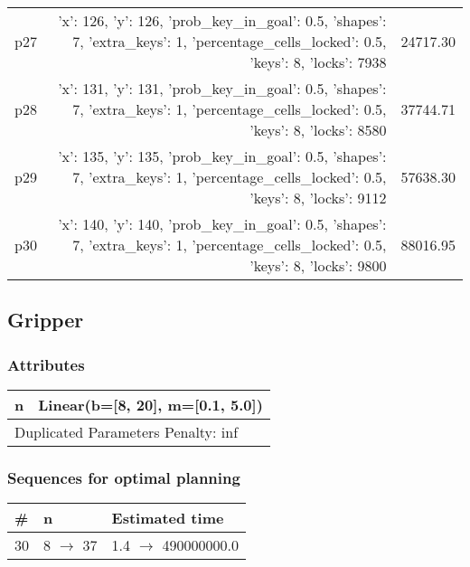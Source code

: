 \documentclass{article}
\begin{document}
\begin{center}
\begin{tabular}{@{}l|r|r@{}}
  p27&{'x': 126, 'y': 126, 'prob\_key\_in\_goal': 0.5, 'shapes': 7, 'extra\_keys': 1, 'percentage\_cells\_locked': 0.5, 'keys': 8, 'locks': 7938}&24717.30\\
  p28&{'x': 131, 'y': 131, 'prob\_key\_in\_goal': 0.5, 'shapes': 7, 'extra\_keys': 1, 'percentage\_cells\_locked': 0.5, 'keys': 8, 'locks': 8580}&37744.71\\
  p29&{'x': 135, 'y': 135, 'prob\_key\_in\_goal': 0.5, 'shapes': 7, 'extra\_keys': 1, 'percentage\_cells\_locked': 0.5, 'keys': 8, 'locks': 9112}&57638.30\\
  p30&{'x': 140, 'y': 140, 'prob\_key\_in\_goal': 0.5, 'shapes': 7, 'extra\_keys': 1, 'percentage\_cells\_locked': 0.5, 'keys': 8, 'locks': 9800}&88016.95
                            \end{tabular}
                            \end{center}
                    
                            \newpage \subsection{Gripper}
                    \subsubsection*{Attributes}
                    \begin{tabular}{@{}p{}p{}@{}}
                    \toprule
                    n & Linear(b=[8, 20], m=[0.1, 5.0]) \\
                    \bottomrule
                    \multicolumn{2}{l}{Duplicated Parameters Penalty: inf}
                    \end{tabular}
                
                            \subsubsection*{Sequences for optimal planning}

                            \begin{center}
                            \begin{tabular}{@{}l|l|l@{}}
                            \# & n & Estimated time\\\midrule
                            30&8 $\rightarrow$ 37&1.4 $\rightarrow$ 490000000.0
                            \end{tabular}
                            \end{center}
                    
\end{document}
